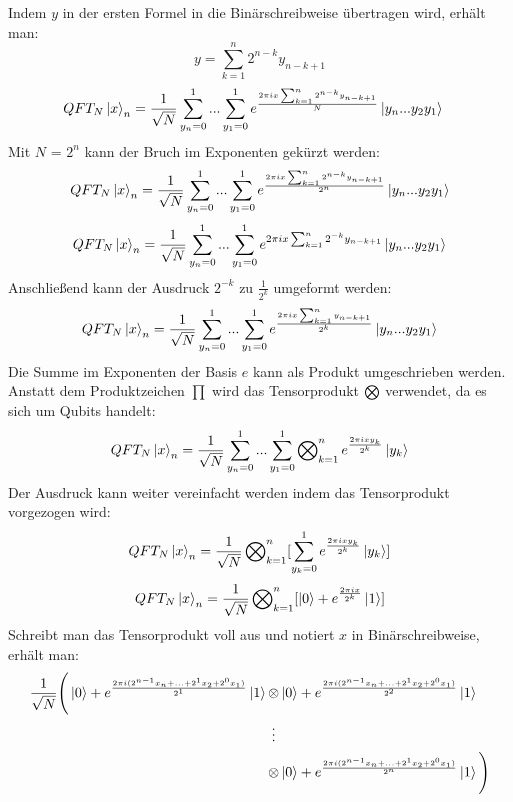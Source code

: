 Indem \(y\) in der ersten Formel in die Binärschreibweise übertragen wird, erhält man:
% 
%
%
\[ y = \sum_{k=1}^{n}2^{n-k} y_{n-k+1}\]  
\begin{align}
  QFT_{N}\ket{x}_{n} &=
    \frac{1}{\sqrt{N}}
    \sum_{y_n=0}^{1} ...
    \sum_{y_1=0}^{1} e^{\frac{2 \pi i x \sum_{k=1}^{n}2^{n-k} y_{n-k+1}}{N}}
    \ket{y_n ... y_{2}y_{1}}
\end{align}
Mit \(N\) = \(2^n\) kann der Bruch im Exponenten gekürzt werden:
\[QFT_{N}\ket{x}_{n} = \frac{1}{\sqrt{N}}\sum_{y_n=0}^{1}...\sum_{y_1=0}^{1}  e^{\frac{2 \pi i x \sum_{k=1}^{n}2^{n-k} y_{n-k+1}}{2^n}}\ket{y_n ... y_{2}y_{1}}\]
\[QFT_{N}\ket{x}_{n} = \frac{1}{\sqrt{N}}\sum_{y_n=0}^{1}...\sum_{y_1=0}^{1}  e^{2 \pi i x \sum_{k=1}^{n}2^{-k} y_{n-k+1}}\ket{y_n ... y_{2}y_{1}}\]
Anschließend kann der Ausdruck \(2^{-k}\) zu \(\frac{1}{2^k}\) umgeformt werden: 
\[QFT_{N}\ket{x}_{n} = \frac{1}{\sqrt{N}}\sum_{y_n=0}^{1}...\sum_{y_1=0}^{1}  e^{\frac{2 \pi i x \sum_{k=1}^{n} y_{n-k+1}}{2^k}}\ket{y_n ... y_{2}y_{1}}\]
Die Summe im Exponenten der Basis \(e\) kann als Produkt umgeschrieben werden.
Anstatt dem Produktzeichen \(\prod\) wird das Tensorprodukt \(\operatorname{\bigotimes}\) verwendet, da es sich um Qubits handelt:
\[QFT_{N}\ket{x}_{n} = \frac{1}{\sqrt{N}}\sum_{y_n=0}^{1}...\sum_{y_1=0}^{1} \operatorname{\bigotimes}_{k=1}^n{ e^{\frac{2 \pi i x y_k}{2^k}}}\ket{y_{k}}\]
Der Ausdruck kann weiter vereinfacht werden indem das Tensorprodukt vorgezogen wird:
\[QFT_{N}\ket{x}_{n} = \frac{1}{\sqrt{N}}\operatorname{\bigotimes}_{k=1}^n [  \sum_{y_k=0}^{1}{ e^{\frac{2 \pi i x y_k}{2^k}}}\ket{y_{k}}]\]
\[QFT_{N}\ket{x}_{n} = \frac{1}{\sqrt{N}}\operatorname{\bigotimes}_{k=1}^n [  \ket{0} + { e^{\frac{2 \pi i x}{2^k}}}\ket{1}]\] 
Schreibt man das Tensorprodukt voll aus und notiert \(x\) in Binärschreibweise, erhält man:
\begin{align*}
\frac{1}{\sqrt{N}}\Bigg(
  \ket{0} + { e^{\frac{2 \pi i (2^{n-1}x_n+...+2^1x_2+2^0x_1)}{2^1}}}\ket{1}
  &\tensor
  \ket{0} + { e^{\frac{2 \pi i (2^{n-1}x_n+...+2^1x_2+2^0x_1)}{2^2}}}\ket{1} \\
  &\vdotswithin{\tensor} \\
  &\tensor
  \ket{0} + { e^{\frac{2 \pi i (2^{n-1}x_n+...+2^1x_2+2^0x_1)}{2^n}}}\ket{1}
  \Bigg)
\end{align*}

